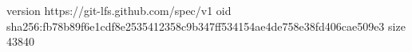 version https://git-lfs.github.com/spec/v1
oid sha256:fb78b89f6e1cdf8e2535412358c9b347ff534154ae4de758e38fd406cae509e3
size 43840
